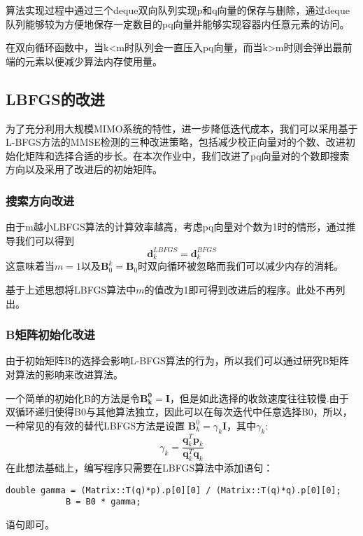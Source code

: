 \documentclass[twocolumn]{ctexart}
\begin{document}
算法实现过程中通过三个deque双向队列实现p和q向量的保存与删除，通过deque队列能够较为方便地保存一定数目的pq向量并能够实现容器内任意元素的访问。

在双向循环函数中，当k<m时队列会一直压入pq向量，而当k>m时则会弹出最前端的元素以便减少算法内存使用量。
\subsection{LBFGS的改进}
\par 为了充分利用大规模MIMO系统的特性，进一步降低迭代成本，我们可以采用基于L-BFGS方法的MMSE检测的三种改进策略，包括减少校正向量对的个数、改进初始化矩阵和选择合适的步长。在本次作业中，我们改进了pq向量对的个数即搜索方向以及采用了改进后的初始矩阵。
\subsubsection{搜索方向改进}
\par 由于m越小LBFGS算法的计算效率越高，考虑pq向量对个数为1时的情形，通过推导我们可以得到\[\mathbf{d}_{k}^{L B F G S}=\mathbf{d}_{k}^{B F G S}\]这意味着当$ m=1\text{以及}\mathbf{B}_0^k =\mathbf{B}_0$时双向循环被忽略而我们可以减少内存的消耗。
\par 基于上述思想将LBFGS算法中$ m $的值改为1即可得到改进后的程序。此处不再列出。
\subsubsection{B矩阵初始化改进}
\par 由于初始矩阵B的选择会影响L-BFGS算法的行为，所以我们可以通过研究B矩阵对算法的影响来改进算法。
\par 一个简单的初始化B的方法是令$ \mathbf{B_k^0=I} $，但是如此选择的收敛速度往往较慢.由于双循环递归使得B0与其他算法独立，因此可以在每次迭代中任意选择B0，所以，一种常见的有效的替代LBFGS方法是设置
$ \mathbf{B}_k^0=\gamma_k\mathbf{I}$，其中$ \gamma_k $:\[\gamma_{k}=\frac{\mathbf{q}_{k}^{T} \mathbf{p}_{k}}{\mathbf{q}_{k}^{T} \mathbf{q}_{k}}\]
\quad 在此想法基础上，编写程序只需要在LBFGS算法中添加语句：
\begin{lstlisting}
double gamma = (Matrix::T(q)*p).p[0][0] / (Matrix::T(q)*q).p[0][0];
			B = B0 * gamma;
\end{lstlisting}
语句即可。
\end{document}
